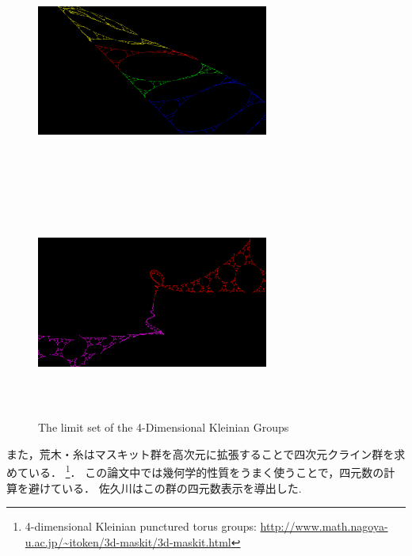 \begin{figure}[h!tbp]
\begin{minipage}{0.49\hsize}
  \subcaption{}
 \end{minipage}
 \begin{minipage}{0.49\hsize}
  \center
  \includegraphics[width=3in, height=3in, keepaspectratio]{../img/klein/sakugawa3.pdf}
  \subcaption{}
 \end{minipage}
 \hspace*{\fill}
 \begin{minipage}{0.49\hsize}
  \center
  \includegraphics[width=3in, height=3in, keepaspectratio]{../img/klein/sakugawa4.pdf}
  \subcaption{}
 \end{minipage}
 \caption{The limit set of the 4-Dimensional Kleinian Groups}
 \label{fig:sakugawa}
\end{figure}

また，荒木・糸はマスキット群を高次元に拡張することで四次元クライン群を求
めている．\cite{araki2008extension}
\footnote{4-dimensional Kleinian punctured torus groups:
\url{http://www.math.nagoya-u.ac.jp/~itoken/3d-maskit/3d-maskit.html}}．
この論文中では幾何学的性質をうまく使うことで，四元数の計算を避けている．
佐久川はこの群の四元数表示を導出した\cite{sakugawa2010limit}.

